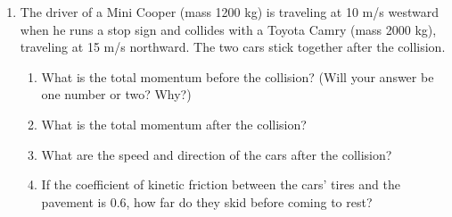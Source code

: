 \documentclass[12pt]{article}
\begin{document}
\begin{enumerate}
\newpage

  \item{The driver of a Mini Cooper (mass 1200 kg) is traveling at 10 m/s westward when he runs a stop sign and collides with a Toyota Camry (mass 2000 kg), traveling at 15 m/s northward. The two cars stick together after the collision.} 
  
  \vspace{2in}
  
  
      \begin{enumerate}
    \item What is the total momentum before the collision? (Will your answer be one number or two? Why?)

\vspace{2.5in}

    \item What is the total momentum after the collision?

\newpage

\vspace{2.5in}
    \item{What are the speed and direction of the cars after the collision?}

\vspace{3in}

    \item{If the coefficient of kinetic friction between the cars' tires and the pavement is 0.6, how far do they skid before coming to rest?}

\vspace{4in}

  \end{enumerate}


\end{enumerate}
   
\end{document}
